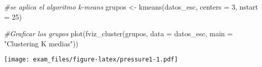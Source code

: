 \documentclass[
]{article}
\newenvironment{Shaded}{\begin{snugshade}}{\end{snugshade}}
\newcommand{\AttributeTok}[1]{\textcolor[rgb]{0.77,0.63,0.00}{#1}}
\newcommand{\CommentTok}[1]{\textcolor[rgb]{0.56,0.35,0.01}{\textit{#1}}}
\newcommand{\DecValTok}[1]{\textcolor[rgb]{0.00,0.00,0.81}{#1}}
\newcommand{\FunctionTok}[1]{\textcolor[rgb]{0.00,0.00,0.00}{#1}}
\newcommand{\NormalTok}[1]{#1}
\newcommand{\OtherTok}[1]{\textcolor[rgb]{0.56,0.35,0.01}{#1}}
\newcommand{\SpecialCharTok}[1]{\textcolor[rgb]{0.00,0.00,0.00}{#1}}
\newcommand{\StringTok}[1]{\textcolor[rgb]{0.31,0.60,0.02}{#1}}
\begin{document}
\begin{Shaded}
\begin{Highlighting}[]
\CommentTok{\#se aplica el algoritmo k{-}means}
\NormalTok{  grupos }\OtherTok{\textless{}{-}} \FunctionTok{kmeans}\NormalTok{(datos\_esc, }\AttributeTok{centers =} \DecValTok{3}\NormalTok{, }\AttributeTok{nstart =} \DecValTok{25}\NormalTok{)}
  
  \CommentTok{\#Graficar los grupos}
  \FunctionTok{plot}\NormalTok{(}\FunctionTok{fviz\_cluster}\NormalTok{(grupos, }\AttributeTok{data =}\NormalTok{ datos\_esc, }\AttributeTok{main =} \StringTok{"Clustering K medias"}\NormalTok{))}
\end{Highlighting}
\end{Shaded}

\texttt{[image: exam\_files/figure-latex/pressure1-1.pdf]}

\begin{Shaded}
\end{Shaded}
\end{document}
